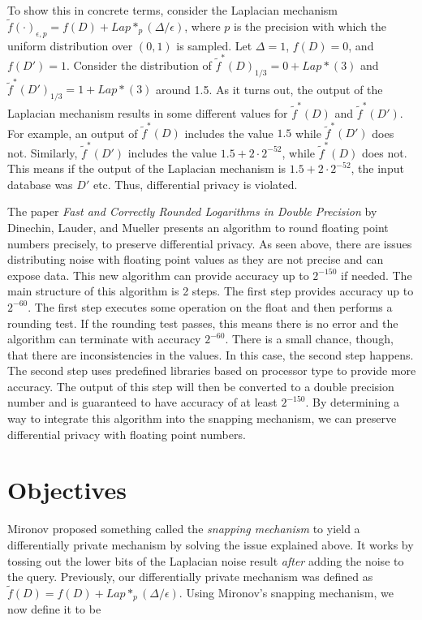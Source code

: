 \documentclass[11pt]{exam}
\begin{document}
To show this in concrete terms, consider the Laplacian mechanism $\tilde{f}(\cdot)_{\epsilon,p} = f(D) + Lap*_p (\Delta/\epsilon)$, where $p$ is the precision with which the uniform distribution over $(0,1)$ is sampled.  Let $\Delta = 1$, $f(D) = 0$, and $f(D') = 1$.  Consider the distribution of $\tilde{f}^*(D)_{1/3} = 0 + Lap*(3)$ and $\tilde{f}^*(D')_{1/3} = 1 + Lap*(3)$ around 1.5.  As it turns out, the output of the Laplacian mechanism results in some different values for $\tilde{f}^*(D)$ and $\tilde{f}^*(D')$.  For example, an output of $\tilde{f}^*(D)$ includes the value $1.5$ while $\tilde{f}^*(D')$ does not.  Similarly, $\tilde{f}^*(D')$ includes the value $1.5 + 2 \cdot 2^{-52}$, while $\tilde{f}^*(D)$ does not.  This means if the output of the Laplacian mechanism is $1.5 + 2 \cdot 2^{-52}$, the input database was $D'$ etc.  Thus, differential privacy is violated.

The paper \textit{Fast and Correctly Rounded Logarithms in Double Precision} by Dinechin, Lauder, and Mueller presents an algorithm to round floating point numbers precisely, to preserve differential privacy. As seen above, there are issues distributing noise with floating point values as they are not precise and can expose data. This new algorithm can provide accuracy up to $2^{-150}$ if needed. The main structure of this algorithm is 2 steps. The first step provides accuracy up to $2^{-60}$. The first step executes some operation on the float and then performs a rounding test. If the rounding test passes, this means there is no error and the algorithm can terminate with accuracy $2^{-60}$. There is a small chance, though, that there are inconsistencies in the values. In this case, the second step happens. The second step uses predefined libraries based on processor type to provide more accuracy. The output of this step will then be converted to a double precision number and is guaranteed to have accuracy of at least $2^{-150}$. By determining a way to integrate this algorithm into the snapping mechanism, we can preserve differential privacy with floating point numbers.  

\section{Objectives} 

Mironov proposed something called the \textit{snapping mechanism} to yield a differentially private mechanism by solving the issue explained above.  It works by tossing out the lower bits of the Laplacian noise result \textit{after} adding the noise to the query.  Previously, our differentially private mechanism was defined as $\tilde{f}(D) = f(D) + Lap*_p (\Delta/\epsilon)$.  Using Mironov's snapping mechanism, we now define it to be
\end{document}
